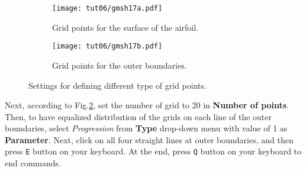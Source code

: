 \begin{figure}[htbp]
    \centering
     \begin{subfigure}[b]{.4\textwidth}
         \centering
         \texttt{[image: tut06/gmsh17a.pdf]}
         \caption{Grid points for the surface of the airfoil.}
         \label{fig6:gmsh17 a}
     \end{subfigure}
     \hfill
     \begin{subfigure}[b]{.4\textwidth}
         \centering
         \texttt{[image: tut06/gmsh17b.pdf]}
         \caption{Grid points for the outer boundaries.}
         \label{fig6:gmsh17 b}
     \end{subfigure}  
    \caption{Settings for defining different type of grid points.}
    \label{fig6:gmsh17}
\end{figure}
Next, according to Fig.\ref{fig6:gmsh17 b}, set the number of grid to 20 in \textbf{Number of points}. Then, to have equalized distribution of the grids on each line of the outer boundaries, select \textit{Progression} from \textbf{Type} drop-down menu with value of 1 as \textbf{Parameter}. Next, click on all four straight lines at outer boundaries, and then press \texttt{E} button on your keyboard. At the end, press \texttt{Q} button on your keyboard to end commands.

